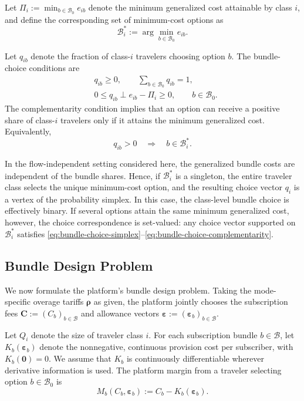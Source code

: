 \documentclass{article}
\begin{document}
Let $\Pi_i:=\min_{b\in\mathcal B_0} e_{ib}$
denote the minimum generalized cost attainable by class $i$, and define the corresponding set of minimum-cost options as
\begin{equation}
\mathcal B_i^*
:=
\arg\min_{b\in\mathcal B_0} e_{ib}.
\label{eq:min-cost-bundle-set}
\end{equation}

Let $q_{ib}$ denote the fraction of class-$i$ travelers choosing option $b$. The bundle-choice conditions are
\begin{align}
&q_{ib}\geq 0,
\qquad
\sum_{b\in\mathcal B_0}q_{ib}=1,
\label{eq:bundle-choice-simplex}\\
&0\leq q_{ib}
\perp
e_{ib}-\Pi_i
\geq0,
\qquad
b\in\mathcal B_0.
\label{eq:bundle-choice-complementarity}
\end{align}
The complementarity condition implies that an option can receive a positive share of class-$i$ travelers only if it attains the minimum generalized cost. Equivalently,
\begin{equation}
q_{ib}>0
\quad\Longrightarrow\quad
b\in\mathcal B_i^*.
\end{equation}

In the flow-independent setting considered here, the generalized bundle costs are independent of the bundle shares. Hence, if $\mathcal B_i^*$ is a singleton, the entire traveler class selects the unique minimum-cost option, and the resulting choice vector $q_i$ is a vertex of the probability simplex. In this case, the class-level bundle choice is effectively binary. If several options attain the same minimum generalized cost, however, the choice correspondence is set-valued: any choice vector supported on $\mathcal B_i^*$ satisfies \eqref{eq:bundle-choice-simplex}--\eqref{eq:bundle-choice-complementarity}.

\subsection{Bundle Design Problem}

We now formulate the platform's bundle design problem. Taking the
mode-specific overage tariffs $\bm\rho$ as given, the platform jointly
chooses the subscription fees $\bm C:=(C_b)_{b\in\mathcal B}$ and
allowance vectors $\bm\varepsilon:=(\bm\varepsilon_b)_{b\in\mathcal B}$.

Let $Q_i$ denote the size of traveler class $i$. For each subscription
bundle $b\in\mathcal B$, let $K_b(\bm\varepsilon_b)$ denote the nonnegative,
continuous provision cost per subscriber, with $K_b(\bm0)=0$. We assume
that $K_b$ is continuously differentiable wherever derivative information
is used. The platform margin from a traveler selecting option $b\in\mathcal B_0$ is
\begin{equation}
    M_b(C_b,\bm\varepsilon_b)
    :=
    C_b-K_b(\bm\varepsilon_b).
    \label{eq:bundle-margin}
\end{equation}
\end{document}
